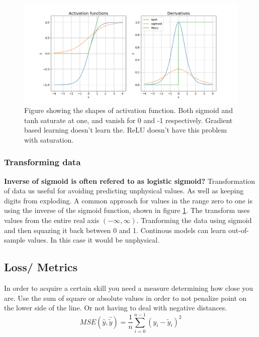 \documentclass{article}
\begin{document}
\begin{figure}
    \centering
    \includegraphics[scale = 0.5]{activation_functions_and_derivatives.png}
    \caption{Figure showing the shapes of activation function. Both sigmoid and tanh saturate at one, and vanish for 0 and -1 respectively. Gradient based learning doesn't learn the. ReLU doesn't have this problem with saturation.}
    \label{fig:activation_func_plus}
\end{figure}



\subsubsection{Transforming data} \label{sec:transforming_cloud_cover}
\textbf{Inverse of sigmoid is often refered to as logistic sigmoid?}
Transformation of data us useful for avoiding predicting unphysical values. As well as keeping digits from exploding.
A common approach for values in the range zero to one is using the inverse of the sigmoid function, shown in figure \ref{fig:activation_func_plus}. The transform uses values from the entire real axis $(-\infty, \infty)$. 
%
Tranforming the data using sigmoid and then squazing it back between 0 and 1. 
Continous models can learn out-of-sample values. In this case it would be unphysical.

\subsection{Loss/ Metrics}  \label{sec:metrics}
In order to acquire a certain skill you need a measure determining how close you are. 
Use the sum of square or absolute values in order to not penalize point on the lower side of the line. Or not having to deal with negative distances. 
\begin{equation} \label{eq:mse}
    MSE(\hat{y},\hat{\tilde{y}}) = \frac{1}{n} \sum_{i=0}^{n-1}(y_i-\tilde{y}_i)^2
\end{equation} 
\end{document}
